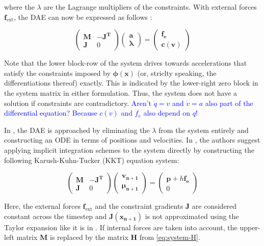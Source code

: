 where the $\lambda$ are the Lagrange multipliers of the constraints. With external forces $\bm{f}_{\text{ext}}$, the DAE can now be 
expressed as follows 
\cite{ascher1995}:

\[
    \begin{pmatrix}
        \bm{M} & \bm{-J^T} \\
        \bm{J} & 0
    \end{pmatrix}
    \begin{pmatrix}
        \bm{a} \\
        \bm{\lambda}
    \end{pmatrix}
    =
    \begin{pmatrix}
        \bm{f_e} \\
        \bm{c(v)}
    \end{pmatrix}
\]

Note that the lower block-row of the system drives towards accelerations that satisfy the constraints imposed by $\bm{\phi(x)}$ (or, striclty 
speaking, the differentiations thereof) exactly. This is indicated by the lower-right zero block in the system matrix in either formulation. 
Thus, the system does not have a solution if constraints are contradictory. \textcolor{blue}{Aren't $\dot{q} = v$ and $\dot{v} = a$ 
also part of the differential equation? Because $c(v)$ and $f_e$ also depend on $q$!}

In \cite{ascher1995}, the DAE is approached by eliminating the $\lambda$ from the system entirely and constructing an ODE in terms of positions
and velocities. In \cite{tournier2015}, the authors suggest applying implicit integration schemes to the system directly by constructing the 
following Karush-Kuhn-Tucker (KKT) equation system:

\[
\begin{pmatrix}
    \bm{M} & \bm{-J^T} \\
    \bm{J} & 0
\end{pmatrix}
\begin{pmatrix}
    \bm{v_{n+1}} \\
    \bm{\mu_{n+1}}
\end{pmatrix}
=
\begin{pmatrix}
    \bm{p} + h\bm{f_e} \\
    0
\end{pmatrix}
\]

Here, the external forces $\bm{f}_{\text{ext}}$ and the constraint gradients $\bm{J}$ are considered constant across the timestep 
and $\bm{J(x_{n+1})}$ 
is not approximated using the Taylor expansion like it is in \cite{baraff1998}. If internal forces are taken into account, the upper-left 
matrix $\bm{M}$ is replaced by the matrix $\bm{H}$ from \cref{eq:system-H}.

